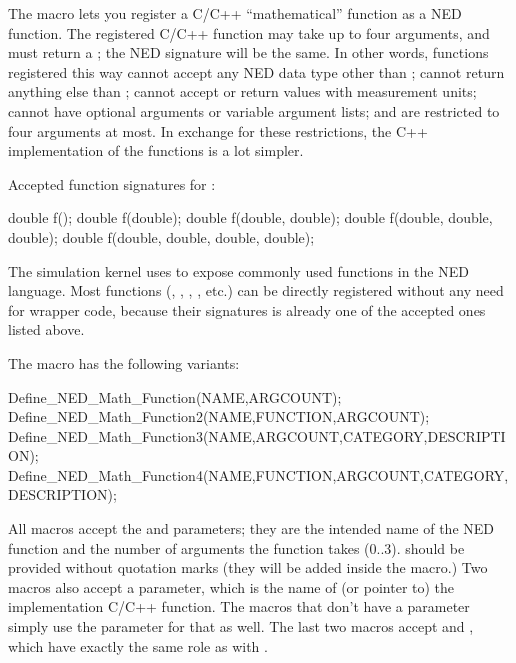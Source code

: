 The  macro lets you register a C/C++
``mathematical'' function as a NED function. The registered C/C++ function
may take up to four  arguments, and must return a ;
the NED signature will be the same. In other words, functions registered
this way cannot accept any NED data type other than ; cannot
return anything else than ; cannot accept or return values with
measurement units; cannot have optional arguments or variable argument
lists; and are restricted to four arguments at most. In exchange for these
restrictions, the C++ implementation of the functions is a lot simpler.

Accepted function signatures for :

\begin{cpp}
double f();
double f(double);
double f(double, double);
double f(double, double, double);
double f(double, double, double, double);
\end{cpp}

The simulation kernel uses  to expose
commonly used  functions in the NED language. Most 
functions (, , , , etc.)
can be directly registered without any need for wrapper code, because their
signatures is already one of the accepted ones listed above.

The macro has the following variants:

\begin{cpp}
Define_NED_Math_Function(NAME,ARGCOUNT);
Define_NED_Math_Function2(NAME,FUNCTION,ARGCOUNT);
Define_NED_Math_Function3(NAME,ARGCOUNT,CATEGORY,DESCRIPTION);
Define_NED_Math_Function4(NAME,FUNCTION,ARGCOUNT,CATEGORY,DESCRIPTION);
\end{cpp}

All macros accept the  and  parameters; they are
the intended name of the NED function and the number of 
arguments the function takes (0..3).  should be provided without
quotation marks (they will be added inside the macro.) Two macros also
accept a  parameter, which is the name of (or pointer to) the
implementation C/C++ function. The macros that don't have a 
parameter simply use the  parameter for that as well. The last
two macros accept  and , which have exactly
the same role as with .

